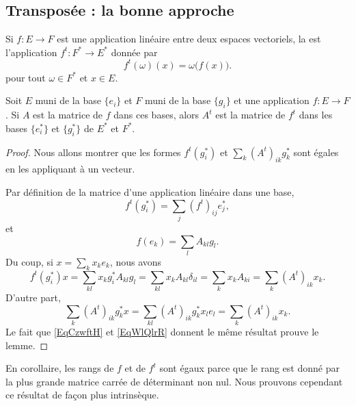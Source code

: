\subsection{Transposée : la bonne approche}

\begin{definition}      \label{DefooZLPAooKTITdd}
    Si \( f\colon E\to F\) est une application linéaire entre deux espaces vectoriels, la  est l'application \( f^t\colon F^*\to E^*\) donnée par
    \begin{equation}
        f^t(\omega)(x)=\omega\big( f(x) \big).
    \end{equation}
    pour tout \( \omega\in F^*\) et \( x\in E\).
\end{definition}

\begin{lemma}
    Soit \( E\) muni de la base \( \{ e_i \}\) et \( F\) muni de la base \( \{ g_i \}\) et une application \( f\colon E\to F\). Si \( A\) est la matrice de \( f\) dans ces bases, alors \( A^t\) est la matrice de \( f^t\) dans les bases \( \{ e^*_i \}\) et \( \{ g^*_i \}\) de \( E^*\) et \( F^*\).
\end{lemma}

\begin{proof}
    Nous allons montrer que les formes \( f^t(g^*_i)\) et \( \sum_k(A^t)_{ik}g^*_k\) sont égales en les appliquant à un vecteur.

    Par définition de la matrice d'une application linéaire dans une base,
    \begin{equation}
        f^t(g_i^*)=\sum_j(f^t)_{ij}e^*_j,
    \end{equation}
    et
    \begin{equation}
        f(e_k)=\sum_lA_{kl}g_l.
    \end{equation}
    Du coup, si \( x=\sum_kx_ke_k\), nous avons
    \begin{equation}    \label{EqCzwftH}
        f^t(g_i^*)x=\sum_{kl}x_kg_i^*A_{kl}g_l=\sum_{kl}x_kA_{kl}\delta_{il}=\sum_k x_kA_{ki}=\sum_k(A^t)_{ik}x_k.
    \end{equation}
    D'autre part,
    \begin{equation}    \label{EqWlQlrR}
        \sum_k(A^t)_{ik}g_k^*x=\sum_{kl}(A^t)_{ik}g^*_kx_le_l=\sum_k(A^t)_{ik}x_k.
    \end{equation}
    Le fait que \eqref{EqCzwftH} et \eqref{EqWlQlrR} donnent le même résultat prouve le lemme.
\end{proof}
En corollaire, les rangs de \( f\) et de \( f^t\) sont égaux parce que le rang est donné par la plus grande matrice carrée de déterminant non nul. Nous prouvons cependant ce résultat de façon plus intrinsèque.

